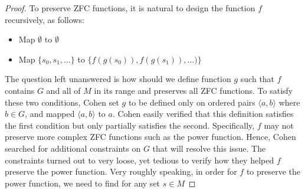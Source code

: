 \begin{proof}
  To preserve ZFC functions, it is natural to design the function $f$
  recursively, as follows:
  \begin{itemize}
    \item Map $\emptyset$ to $\emptyset$
    \item Map $\{s_0,s_1,\ldots\}$ to $\{f(g(s_0)),f(g(s_1)),\ldots)\}$
  \end{itemize}

  The question left unanswered is how should we define function $g$ such
  that $f$ contains $G$ and all of $M$ in its range and preserves all ZFC
  functions. To satisfy these two conditions, Cohen set $g$ to be defined
  only on ordered pairs $\langle a,b\rangle$ where $b\in G$, and mapped
  $\langle a,b\rangle$ to $a$. Cohen easily verified that this definition
  satisfies the first condition but only partially satisfies the second.
  Specifically, $f$ may not preserve more complex ZFC functions such as the
  power function. Hence, Cohen searched for additional constraints on $G$
  that will resolve this issue. The constraints turned out to very loose,
  yet tedious to verify how they helped $f$ preserve the power function.
  Very roughly speaking, in order for $f$ to preserve the power function,
  we need to find for any set $s\in M$
\end{proof}
